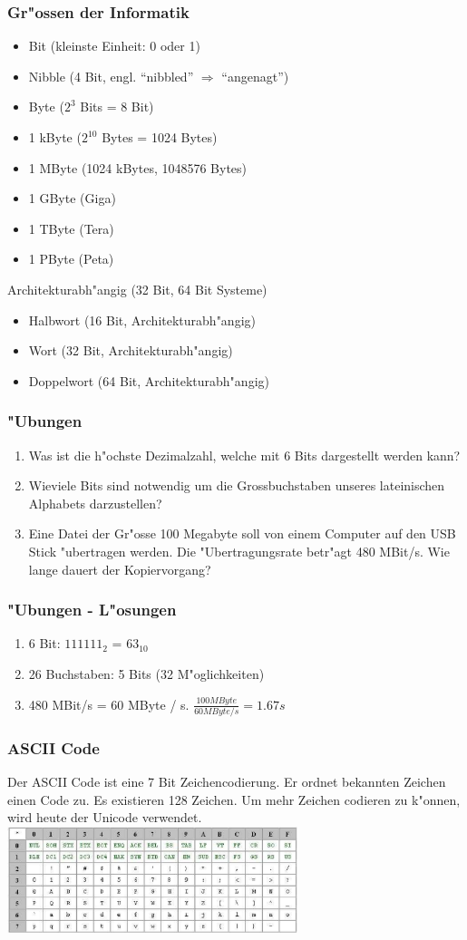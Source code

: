 \documentclass{beamer}
\begin{document}
\frame
{
	\frametitle{Gr"ossen der Informatik}
	{\small
	\begin{itemize}
	\item Bit (kleinste Einheit: 0 oder 1)
	\item Nibble (4 Bit, engl. ``nibbled'' $\Rightarrow$ ``angenagt'')
	\item Byte ($2^3$ Bits = 8 Bit)
	\item 1 kByte ($2^{10}$ Bytes = 1024 Bytes)
	\item 1 MByte (1024 kBytes, 1048576 Bytes)
	\item 1 GByte (Giga)
	\item 1 TByte (Tera)
	\item 1 PByte (Peta)
	\end{itemize}
	Architekturabh"angig (32 Bit, 64 Bit Systeme)
	\begin{itemize}
	\item Halbwort (16 Bit, Architekturabh"angig)
	\item Wort (32 Bit, Architekturabh"angig)
	\item Doppelwort (64 Bit, Architekturabh"angig)
	\end{itemize}
	}
}

\frame
{
	\frametitle{"Ubungen}
	\begin{enumerate}
	\item Was ist die h"ochste Dezimalzahl, welche mit 6 Bits dargestellt werden kann?
	\item Wieviele Bits sind notwendig um die Grossbuchstaben unseres lateinischen Alphabets darzustellen?
	\item Eine Datei der Gr"osse 100 Megabyte soll von einem Computer auf den USB Stick
	"ubertragen werden. Die "Ubertragungsrate betr"agt 480 MBit/s. Wie lange dauert der Kopiervorgang?
	\end{enumerate}
}

\frame
{
	\frametitle{"Ubungen - L"osungen}
	\begin{enumerate}
	\item 6 Bit: $111111_2$ = $63_{10}$
	\item 26 Buchstaben: 5 Bits (32 M"oglichkeiten)
	\item 480 MBit/s = 60 MByte / s. $\frac{100 MByte}{60 MByte/s} = 1.67s$
	\end{enumerate}
}

\frame
{
	\frametitle{ASCII Code}
	Der ASCII Code ist eine 7 Bit Zeichencodierung. Er ordnet bekannten Zeichen
	einen Code zu. Es existieren 128 Zeichen. Um mehr Zeichen codieren zu k"onnen,
	wird heute der Unicode verwendet.\\
	\includegraphics[width=240pt]{ascii.eps}
}
\end{document}
